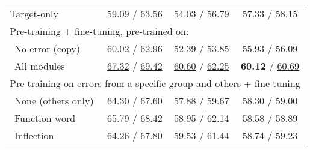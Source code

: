 \documentclass[11pt]{article}
\begin{document}
\begin{table}[t]
	\scriptsize
	\fontsize{7.5pt}{8.5pt}\selectfont
	\centering
	\tabcolsep 4pt
	\begin{tabular}{lccc}
		\hline
		& \hspace{-1em}{$\def\arraystretch{0.5}\begin{array}{c}\vspace{-0.5em}\\\text{BEA-19}\\\text{test}\\\end{array}$}\hspace{-1em}
		& \hspace{-1em}{$\def\arraystretch{0.5}\begin{array}{c}\vspace{-0.5em}\\\text{CoNLL}\\\text{14}\\\end{array}$}\hspace{-1em}
		& \hspace{-1em}{$\def\arraystretch{0.5}\begin{array}{c}\vspace{-0.5em}\\\text{JFLEG}\\\text{test}\\\end{array}$}\hspace{-1em}
		\\ \hline
		Target-only
		& 59.09 / 63.56
		& 54.03 / 56.79
		& 57.33 / 58.15
		\\
		\hline
		\hline
		\multicolumn{4}{l}{Pre-training + fine-tuning, pre-trained on:}
		\\
		\ No error (copy)
		& 60.02 / 62.96
		& 52.39 / 53.85
		& 55.93 / 56.09
		\\
		\ All modules
		& \underline{67.32} / \underline{69.42}
		& \underline{60.60} / \underline{62.25}
		& \textbf{60.12} / \underline{60.69}
		\\
		\hline
		\multicolumn{4}{l}{Pre-training on errors from a specific group and others + fine-tuning}
		\\
		\ None (others only)
		& 64.30 / 67.60
		& 57.88 / 59.67
		& 58.30 / 59.00
		\\
		\ Function word
		& 65.79 / 68.42
		& 58.95 / 62.14
		& 58.58 / 58.89
		\\
		\ Inflection
		& 64.26 / 67.80
		& 59.53 / 61.44
		& 58.74 / 59.23

\end{tabular}
\end{table}
\end{document}
